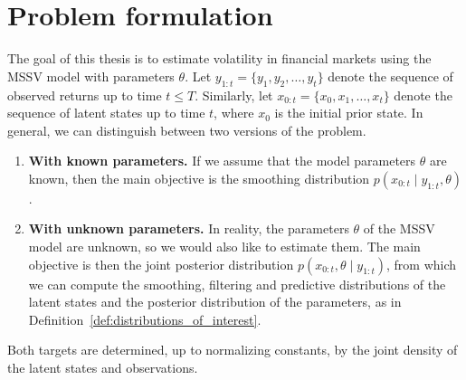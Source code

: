 \section{Problem formulation}
\label{sec:problem_formulation}
The goal of this thesis is to estimate volatility in financial markets using the MSSV model with parameters $\theta$. 
Let $y_{1:t} = \{y_1, y_2, \ldots, y_t\}$ denote the sequence of observed returns up to time $t \leq T$. Similarly, let $x_{0:t} = \{x_0, x_1, \ldots, x_t\}$ denote the sequence of latent states up to time $t$, where $x_0$ is the initial prior state.
In general, we can distinguish between two versions of the problem.
\begin{enumerate}
    \item \textbf{With known parameters.} If we assume that the model parameters $\theta$ are known, then the main objective is the smoothing distribution $p(x_{0:t} \mid y_{1:t}, \theta)$.
    \item \textbf{With unknown parameters.} In reality, the parameters $\theta$ of the MSSV model are unknown, so we would also like to estimate them. The main objective is then the joint posterior distribution $p(x_{0:t}, \theta \mid y_{1:t})$, from which we can compute the smoothing, filtering and predictive distributions of the latent states and the posterior distribution of the parameters, as in Definition~\ref{def:distributions_of_interest}.
\end{enumerate}
Both targets are determined, up to normalizing constants, by the joint density of the latent states and observations.


